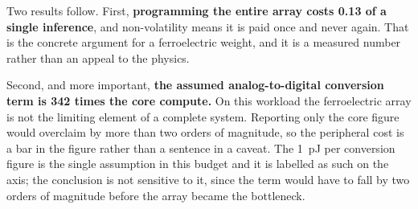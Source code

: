 Two results follow. First, \textbf{programming the entire array costs \num{0.13} of a
single inference}, and non-volatility means it is paid once and never again. That is the
concrete argument for a ferroelectric weight, and it is a measured number rather than an
appeal to the physics.

Second, and more important, \textbf{the assumed analog-to-digital conversion term is
\num{342} times the core compute.} On this workload the ferroelectric array is not the
limiting element of a complete system. Reporting only the core figure would overclaim by
more than two orders of magnitude, so the peripheral cost is a bar in the figure rather
than a sentence in a caveat. The \SI{1}{\pico\joule} per conversion figure is the single
assumption in this budget and it is labelled as such on the axis; the conclusion is not
sensitive to it, since the term would have to fall by two orders of magnitude before the
array became the bottleneck.
